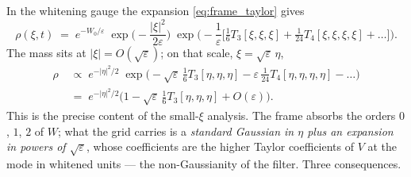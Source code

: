 \documentclass[11pt,a4paper]{article}
\newcommand{\eps}{\varepsilon}
\newcommand{\abs}[1]{\left\lvert #1 \right\rvert}
\theoremstyle{plain}
\theoremstyle{definition}
\theoremstyle{remark}
\begin{document}
In the whitening gauge the expansion \eqref{eq:frame_taylor} gives
\[
  \rho(\xi,t) \;=\; e^{-W_0/\eps}\;\exp\Big(-\frac{\abs\xi^2}{2\eps}\Big)\;\exp\Big(-\frac{1}{\eps}\Big[\tfrac16T_3[\xi,\xi,\xi] + \tfrac1{24}T_4[\xi,\xi,\xi,\xi] + \dots\Big]\Big).
\]
The mass sits at $\abs\xi = O(\sqrt\eps)$; on that scale, $\xi = \sqrt\eps\,\eta$,
\begin{equation}
\begin{aligned}
  \rho \;&\propto\; e^{-\abs\eta^2/2}\;\exp\Big(-\sqrt\eps\,\tfrac16T_3[\eta,\eta,\eta] - \eps\,\tfrac1{24}T_4[\eta,\eta,\eta,\eta] - \dots\Big) \\
  &=\; e^{-\abs\eta^2/2}\Big(1 - \sqrt\eps\,\tfrac16T_3[\eta,\eta,\eta] + O(\eps)\Big).
\end{aligned}
  \label{eq:frame_scaled}
\end{equation}
This is the precise content of the small-$\xi$ analysis. The frame absorbs the orders $0$, $1$, $2$ of $W$; what the grid carries is a \emph{standard Gaussian in $\eta$ plus an expansion in powers of $\sqrt\eps$}, whose coefficients are the higher Taylor coefficients of $V$ at the mode in whitened units --- the non-Gaussianity of the filter. Three consequences.
\end{document}
